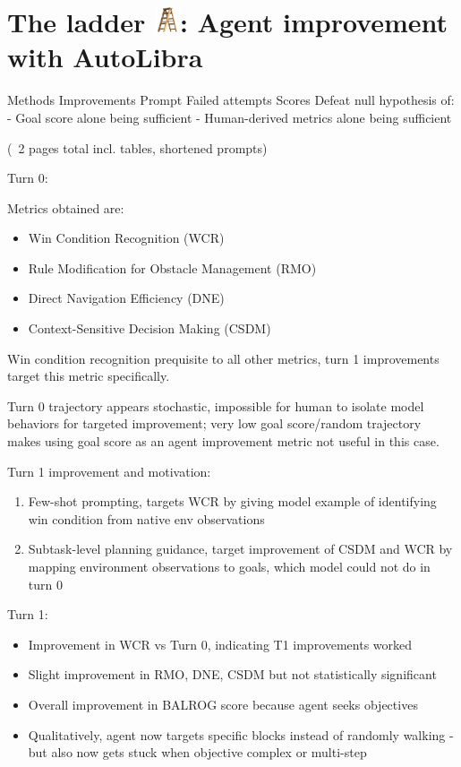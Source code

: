 \section{The ladder \protect\includegraphics[height=1em]{figs/ladder.png}: Agent improvement with AutoLibra}

Methods
Improvements
Prompt
Failed attempts
Scores
Defeat null hypothesis of:
- Goal score alone being sufficient
- Human-derived metrics alone being sufficient

(~2 pages total incl. tables, shortened prompts)

Turn 0:

Metrics obtained are:
\begin{itemize}
    \item Win Condition Recognition (WCR)
    \item Rule Modification for Obstacle Management (RMO)
    \item Direct Navigation Efficiency (DNE)
    \item Context-Sensitive Decision Making (CSDM)
\end{itemize}
Win condition recognition prequisite to all other metrics, turn 1 improvements target this metric specifically.

Turn 0 trajectory appears stochastic, impossible for human to isolate model behaviors for targeted improvement; very low goal score/random trajectory makes using goal score as an agent improvement metric not useful in this case.

Turn 1 improvement and motivation:
\begin{enumerate}
    \item Few-shot prompting, targets WCR by giving model example of identifying win condition from native env observations
    \item Subtask-level planning guidance, target improvement of CSDM and WCR by mapping environment observations to goals, which model could not do in turn 0
\end{enumerate}

Turn 1:

\begin{itemize}
    \item Improvement in WCR vs Turn 0, indicating T1 improvements worked
    \item Slight improvement in RMO, DNE, CSDM but not statistically significant
    \item Overall improvement in BALROG score because agent seeks objectives
    \item Qualitatively, agent now targets specific blocks instead of randomly walking - but also now gets stuck when objective complex or multi-step
\end{itemize}

